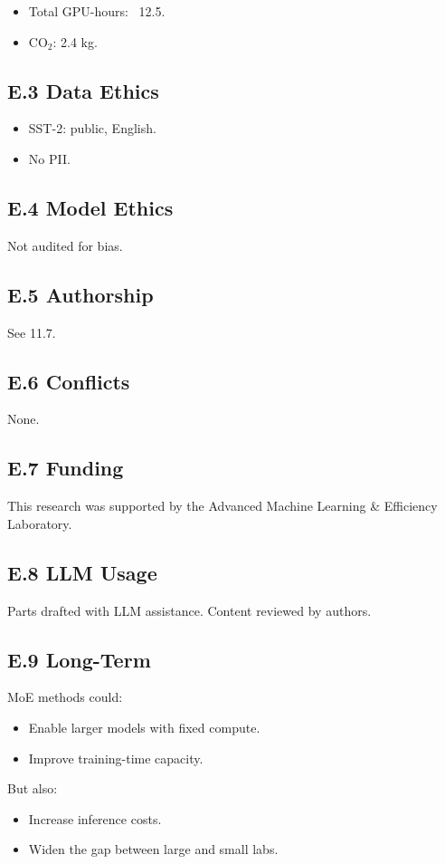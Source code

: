 \begin{itemize}
\item Total GPU-hours: ~12.5.
\item CO$_2$: 2.4 kg.

\end{itemize}
\subsection{E.3 Data Ethics}

\begin{itemize}
\item SST-2: public, English.
\item No PII.

\end{itemize}
\subsection{E.4 Model Ethics}

Not audited for bias.

\subsection{E.5 Authorship}

See  11.7.

\subsection{E.6 Conflicts}

None.

\subsection{E.7 Funding}

This research was supported by the Advanced Machine Learning \& Efficiency Laboratory.

\subsection{E.8 LLM Usage}

Parts drafted with LLM assistance. Content reviewed by authors.

\subsection{E.9 Long-Term}

MoE methods could:
\begin{itemize}
\item Enable larger models with fixed compute.
\item Improve training-time capacity.

\end{itemize}
But also:
\begin{itemize}
\item Increase inference costs.
\item Widen the gap between large and small labs.

\end{itemize}
